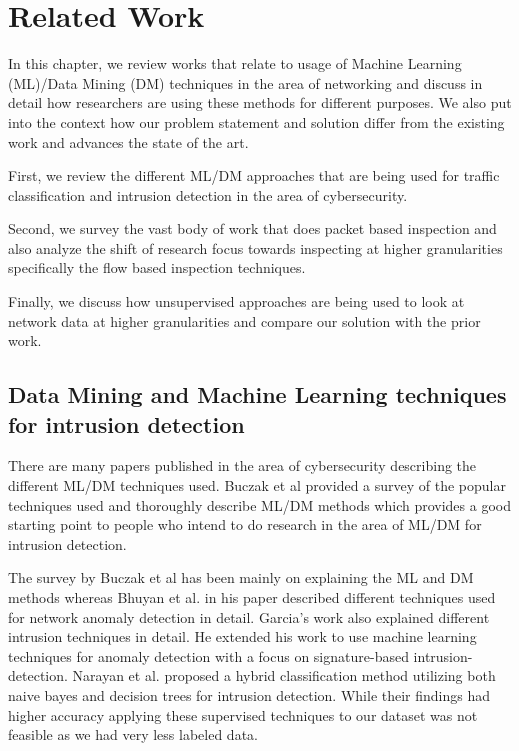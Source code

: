 
\chapter{Related Work}

In this chapter, we review works that relate to usage of Machine Learning (ML)/Data Mining (DM) techniques in the area of networking and discuss in detail how researchers are using these methods for different purposes. We also put into the context how our problem statement and solution differ from the existing work and advances the state of the art.

First, we review the different ML/DM approaches that are being used for traffic classification and intrusion detection in the area of cybersecurity.

Second, we survey the vast body of work that does packet based inspection and also analyze the shift of research focus towards inspecting at higher granularities specifically the flow based inspection techniques.

Finally, we discuss how unsupervised approaches are being used to look at network data at higher granularities and compare our solution with the prior work. 



\section{Data Mining and Machine Learning techniques for intrusion detection}

There are many papers published in the area of cybersecurity describing the different ML/DM techniques used. Buczak et al \cite{buczak2016survey} provided a survey of  the popular techniques used and thoroughly describe ML/DM methods which provides a good starting point to people who intend to do research in the area of ML/DM for intrusion detection.

The survey by Buczak et al \cite{buczak2016survey} has been mainly on explaining the ML and DM methods whereas Bhuyan et al. \cite{bhuyan2014network} in his paper described different techniques used for network anomaly detection in detail. Garcia's work \cite{garcia2009anomaly} also explained different intrusion techniques in detail. He extended his work to  use machine learning techniques for anomaly detection with a focus on signature-based intrusion-detection.
Narayan et al. \cite{peddabachigari2007modeling} proposed a hybrid classification method utilizing both naive bayes and decision trees for intrusion detection. While their findings had higher accuracy applying these supervised techniques to our dataset was not feasible as we had very less labeled data.

